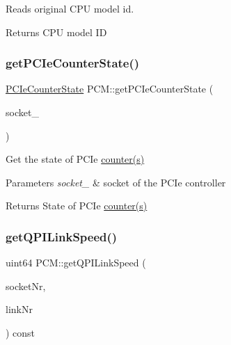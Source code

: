 Reads original C\+PU model id. 

\begin{DoxyReturn}{Returns}
C\+PU model ID 
\end{DoxyReturn}
\mbox{\label{class_p_c_m_a3b1b549672af4c14c00eb7d461c87ac4}} 
\subsubsection{\texorpdfstring{get\+P\+C\+Ie\+Counter\+State()}{getPCIeCounterState()}}
{\footnotesize\ttfamily \mbox{\hyperlink{class_simple_counter_state}{P\+C\+Ie\+Counter\+State}} P\+C\+M\+::get\+P\+C\+Ie\+Counter\+State (\begin{DoxyParamCaption}\item[{const uint32}]{socket\+\_\+ }\end{DoxyParamCaption})}



Get the state of P\+C\+Ie \mbox{\hyperlink{structcounter}{counter(s)}} 


\begin{DoxyParams}{Parameters}
{\em socket\+\_\+} & socket of the P\+C\+Ie controller \\
\hline
\end{DoxyParams}
\begin{DoxyReturn}{Returns}
State of P\+C\+Ie \mbox{\hyperlink{structcounter}{counter(s)}} 
\end{DoxyReturn}
\mbox{\label{class_p_c_m_a9bfa5b2f12f2e98382f9d8ddbc0c02e1}} 
\subsubsection{\texorpdfstring{get\+Q\+P\+I\+Link\+Speed()}{getQPILinkSpeed()}}
{\footnotesize\ttfamily uint64 P\+C\+M\+::get\+Q\+P\+I\+Link\+Speed (\begin{DoxyParamCaption}\item[{uint32}]{socket\+Nr,  }\item[{uint32}]{link\+Nr }\end{DoxyParamCaption}) const\hspace{0.3cm}{\ttfamily [inline]}}



